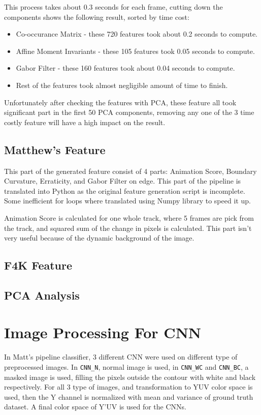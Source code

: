 \documentclass[bsc,logo,twoside,fullspacing,parskip]{infthesis}
\begin{document}
This process takes about 0.3 seconds for each frame, cutting down the components shows the following result, sorted by time cost:
\begin{itemize}
\item
Co-occurance Matrix - these 720 features took about 0.2 seconds to compute.
\item
Affine Moment Invariants - these 105 features took 0.05 seconds to compute.
\item
Gabor Filter - these 160 features took about 0.04 seconds to compute.
\item
Rest of the features took almost negligible amount of time to finish.
\end{itemize}
Unfortunately after checking the features with PCA, these feature all took significant part in the first 50 PCA components, removing any one of the 3 time costly feature will have a high impact on the result.

\subsection{Matthew's Feature}

This part of the generated feature consist of 4 parts: Animation Score, Boundary Curvature, Erraticity, and Gabor Filter on edge. This part of the pipeline is translated into Python as the original feature generation script is incomplete. Some inefficient for loops where translated using Numpy library to speed it up.

Animation Score is calculated for one whole track, where 5 frames are pick from the track, and squared sum of the change in pixels is calculated. This part isn't very useful because of the dynamic background of the image.
\subsection{F4K Feature}

\subsection{PCA Analysis}

\section{Image Processing For CNN}

In Matt's pipeline classifier, 3 different CNN were used on different type of preprocessed images.
In  {\tt CNN\_N}, normal image is used, in {\tt CNN\_WC} and {\tt CNN\_BC}, a masked image is used, filling the pixels outside the contour with white and black respectively.
For all 3 type of images, and transformation to YUV color space is used, then the Y channel is normalized with mean and variance of ground truth dataset.
A final color space of Y'UV is used for the CNNs.
\end{document}
